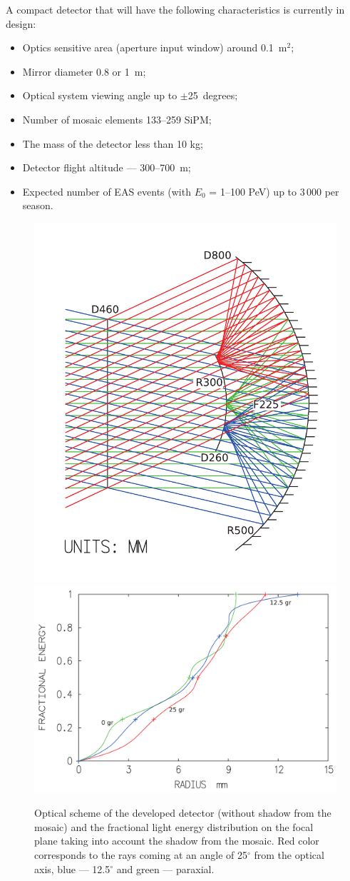 \documentclass[a4paper,11pt]{article}
\begin{document}
A compact detector that will have the following characteristics is currently in design:

\begin{itemize}
\item Optics sensitive area (aperture input window) around 0.1~m$^2$;
\item Mirror diameter 0.8 or 1~m;
\item Optical system viewing angle up to $\pm$25~degrees;
\item Number of mosaic elements 133--259 SiPM;
\item The mass of the detector less than 10 kg;
\item Detector flight altitude --- 300--700~m;
\item Expected number of EAS events (with $E_0$ = 1--100 PeV) up to 3\,000 per season.
\end{itemize}

\begin{figure}[bt]
\centering %
\includegraphics[width=.32\textwidth,clip]{Sphere3optic.pdf}
\qquad
\includegraphics[width=.55\textwidth]{Sphere3spot_energy.pdf}
\caption{Optical scheme of the developed detector (without shadow from the mosaic) and the fractional light energy distribution on the focal plane taking into account the shadow from the mosaic. Red color corresponds to the rays coming at an angle of 25$^\circ$ from the optical axis, blue --- 12.5$^\circ$ and green --- paraxial.}
\label{fig:optic_sphere3}
\end{figure}
\end{document}
